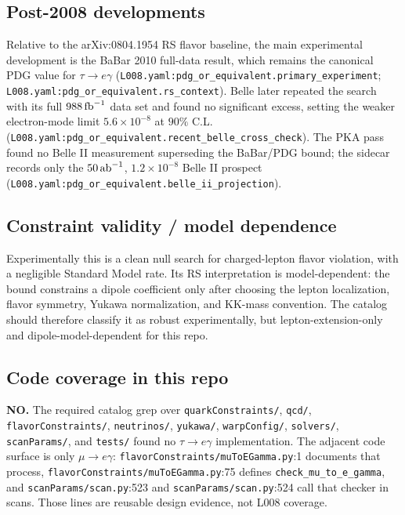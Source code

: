 \subsection*{Post-2008 developments}
Relative to the arXiv:0804.1954 RS flavor baseline, the main experimental
development is the BaBar 2010 full-data result, which remains the canonical
PDG value for \(\tau\to e\gamma\)
(\texttt{L008.yaml:pdg\_or\_equivalent.primary\_experiment};
\texttt{L008.yaml:pdg\_or\_equivalent.rs\_context}).  Belle later repeated the
search with its full \(988\,{\rm fb}^{-1}\) data set and found no significant
excess, setting the weaker electron-mode limit \(5.6\times10^{-8}\) at
\(90\%\) C.L.
(\texttt{L008.yaml:pdg\_or\_equivalent.recent\_belle\_cross\_check}).  The PKA
pass found no Belle II measurement superseding the BaBar/PDG bound; the
sidecar records only the \(50\,{\rm ab}^{-1}\),
\(1.2\times10^{-8}\) Belle II prospect
(\texttt{L008.yaml:pdg\_or\_equivalent.belle\_ii\_projection}).

\subsection*{Constraint validity / model dependence}
Experimentally this is a clean null search for charged-lepton flavor
violation, with a negligible Standard Model rate.  Its RS interpretation is
model-dependent: the bound constrains a dipole coefficient only after choosing
the lepton localization, flavor symmetry, Yukawa normalization, and KK-mass
convention.  The catalog should therefore classify it as robust
experimentally, but lepton-extension-only and dipole-model-dependent for this
repo.

\subsection*{Code coverage in this repo}
\textbf{NO.}  The required catalog grep over \texttt{quarkConstraints/},
\texttt{qcd/}, \texttt{flavorConstraints/}, \texttt{neutrinos/},
\texttt{yukawa/}, \texttt{warpConfig/}, \texttt{solvers/},
\texttt{scanParams/}, and \texttt{tests/} found no \(\tau\to e\gamma\)
implementation.  The adjacent code surface is only \(\mu\to e\gamma\):
\texttt{flavorConstraints/muToEGamma.py}:1 documents that process,
\texttt{flavorConstraints/muToEGamma.py}:75 defines
\texttt{check\_mu\_to\_e\_gamma}, and \texttt{scanParams/scan.py}:523 and
\texttt{scanParams/scan.py}:524 call that checker in scans.  Those lines are
reusable design evidence, not L008 coverage.

